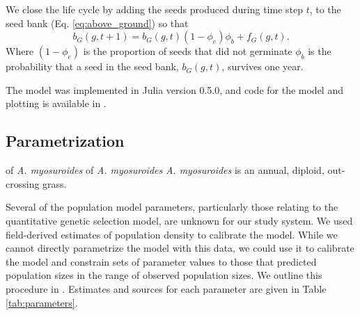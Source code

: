 \documentclass[10pt,letterpaper]{article}
\begin{document}
We close the life cycle by adding the seeds produced during time step $t$, to the seed bank (Eq. \ref{eq:above_ground}) so that 
\begin{equation}
	b_G(g, t + 1) = b_G(g, t)(1 - \phi_e)\phi_b + f_G(g, t).  
\end{equation}
Where $(1 - \phi_e)$ is the proportion of seeds that did not germinate $\phi_b$ is the probability that a seed in the seed bank, $b_G(g, t)$, survives one year. 

The model was implemented in Julia version 0.5.0, and code for the model and plotting is available in .

\subsection*{Parametrization}
of \textit{A. myosuroides}
of \textit{A. myosuroides} 
\textit{A. myosuroides} is an annual, diploid, out-crossing grass. 

Several of the population model parameters, particularly those relating to the quantitative genetic selection model, are unknown for our study system. We used field-derived estimates of population density to calibrate the model. While we cannot directly parametrize the model with this data, we could use it to calibrate the model and constrain sets of parameter values to those that predicted population sizes in the range of observed population sizes. We outline this procedure in . Estimates and sources for each parameter are given in Table \ref{tab:parameters}.          
\end{document}
